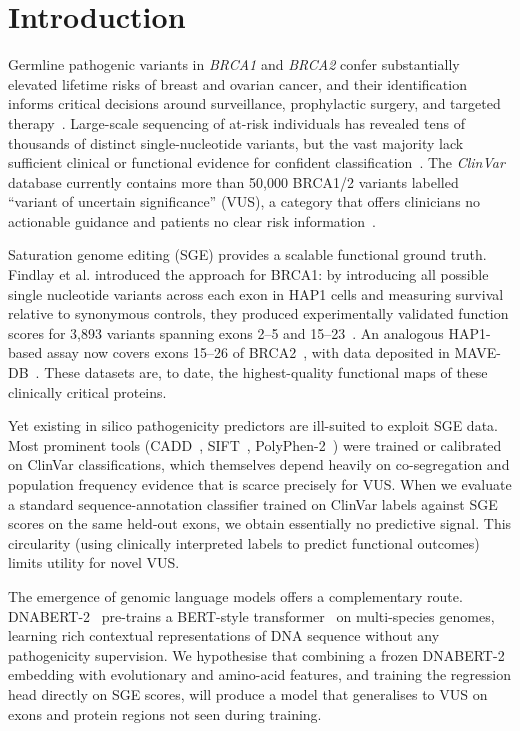 \documentclass[12pt]{article}
\begin{document}
\section{Introduction}
\label{sec:intro}

Germline pathogenic variants in \emph{BRCA1} and \emph{BRCA2} confer substantially
elevated lifetime risks of breast and ovarian cancer, and their identification informs
critical decisions around surveillance, prophylactic surgery, and targeted
therapy~\citep{enigma}.
Large-scale sequencing of at-risk individuals has revealed tens of thousands of distinct
single-nucleotide variants, but the vast majority lack sufficient clinical or functional
evidence for confident classification~\citep{clinvar, brca_exchange}.
The \emph{ClinVar} database currently contains more than 50{,}000 BRCA1/2 variants
labelled ``variant of uncertain significance'' (VUS), a category that offers clinicians
no actionable guidance and patients no clear risk information~\citep{clinvar}.

Saturation genome editing (SGE) provides a scalable functional ground truth.
Findlay et al. introduced the approach for BRCA1: by introducing all possible single
nucleotide variants across each exon in HAP1 cells and measuring survival relative to
synonymous controls, they produced experimentally validated function scores for 3{,}893
variants spanning exons 2--5 and 15--23~\citep{findlay2018}.
An analogous HAP1-based assay now covers exons 15--26 of BRCA2~\citep{huang2025},
with data deposited in MAVE-DB~\citep{mavedb}.
These datasets are, to date, the highest-quality functional maps of these clinically
critical proteins.

Yet existing in silico pathogenicity predictors are ill-suited to exploit SGE data.
Most prominent tools (CADD~\citep{cadd}, SIFT~\citep{sift},
PolyPhen-2~\citep{polyphen2}) were trained or calibrated on ClinVar classifications,
which themselves depend heavily on co-segregation and population frequency evidence that
is scarce precisely for VUS.
When we evaluate a standard sequence-annotation classifier trained on ClinVar labels
against SGE scores on the same held-out exons, we obtain essentially no predictive signal.
This circularity (using clinically interpreted labels to predict functional
outcomes) limits utility for novel VUS.

The emergence of genomic language models offers a complementary route.
DNABERT-2~\citep{dnabert2} pre-trains a BERT-style transformer~\citep{bert} on
multi-species genomes, learning rich contextual representations of DNA sequence without
any pathogenicity supervision.
We hypothesise that combining a frozen DNABERT-2 embedding with evolutionary and
amino-acid features, and training the regression head directly on SGE scores, will
produce a model that generalises to VUS on exons and protein regions not seen during
training.
\end{document}
